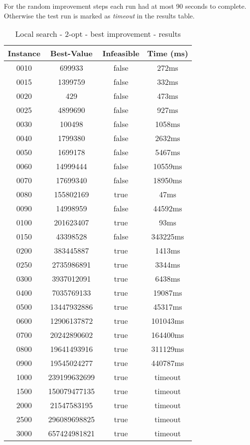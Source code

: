 For the random improvement steps each run had at most 90 seconds to complete. Otherwise the test run is marked as \textit{timeout} in the results table.
\begin{table}
\centering
	\begin{tabular}{|| c | c | c | c ||} 
		\hline
		Instance & Best-Value & Infeasible & Time (ms) \\
		\hline\hline
0010 & 699933 & false & 272ms \\
0015 & 1399759 & false & 332ms \\
0020 & 429 & false & 473ms \\
0025 & 4899690 & false & 927ms \\
0030 & 100498 & false & 1058ms \\
0040 & 1799380 & false & 2632ms \\
0050 & 1699178 & false & 5467ms \\
0060 & 14999444 & false & 10559ms \\
0070 & 17699340 & false & 18950ms \\
0080 & 155802169 & true & 47ms \\
0090 & 14998959 & false & 44592ms \\
0100 & 201623407 & true & 93ms \\
0150 & 43398528 & false & 343225ms \\
0200 & 383445887 & true & 1413ms \\
0250 & 2735986891 & true & 3344ms \\
0300 & 3937012091 & true & 6438ms \\
0400 & 7035769133 & true & 19087ms \\
0500 & 13447932886 & true & 45317ms \\
0600 & 12906137872 & true & 101043ms \\
0700 & 20242890602 & true & 164400ms \\
0800 & 19641493916 & true & 311129ms \\
0900 & 19545024277 & true & 440787ms \\
1000 & 239199632699 & true & timeout \\
1500 & 150079477135 & true & timeout \\
2000 & 21547583195 & true & timeout \\
2500 & 296089698825 & true & timeout \\
3000 & 657424981821 & true & timeout \\
		\hline
	\end{tabular}
\caption{Local search - 2-opt - best improvement - results}
\end{table}

